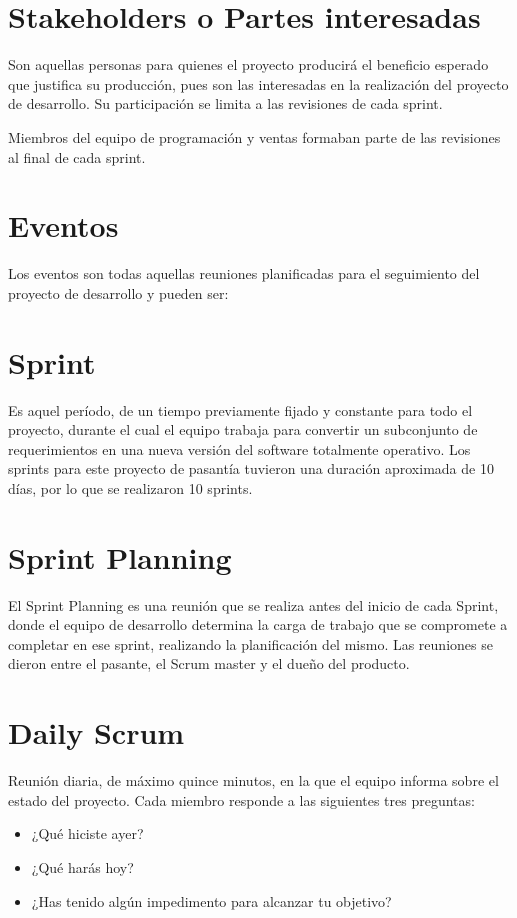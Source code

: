 \section{Stakeholders o Partes interesadas}
Son aquellas personas para quienes el proyecto producirá el beneficio esperado que justifica su producción, pues son las interesadas en la realización del proyecto de desarrollo. Su participación se limita a las revisiones de cada sprint.

Miembros del equipo de programación y ventas formaban parte de las revisiones al final de cada sprint.

\section{Eventos}
Los eventos son todas aquellas reuniones planificadas para el seguimiento del proyecto de desarrollo y pueden ser:

\section{Sprint}
Es aquel período, de un tiempo previamente fijado y constante para todo el proyecto, durante el cual el equipo trabaja para convertir un subconjunto de requerimientos en una nueva versión del software totalmente operativo. Los sprints para este proyecto de pasantía tuvieron una duración aproximada de 10 días, por lo que se realizaron 10 sprints.

\section{Sprint Planning}
El Sprint Planning es una reunión que se realiza antes del inicio de cada Sprint, donde el equipo de desarrollo determina la carga de trabajo que se compromete a completar en ese sprint, realizando la planificación del mismo. Las reuniones se dieron entre el pasante, el Scrum master y el dueño del producto.

\section{Daily Scrum}
Reunión diaria, de máximo quince minutos, en la que el equipo informa sobre el estado del proyecto. Cada miembro responde a las siguientes tres preguntas:

\begin{itemize}
	\item 	¿Qué hiciste ayer?
	\item 	¿Qué harás hoy?
	\item 	¿Has tenido algún impedimento para alcanzar tu objetivo?
\end{itemize}

